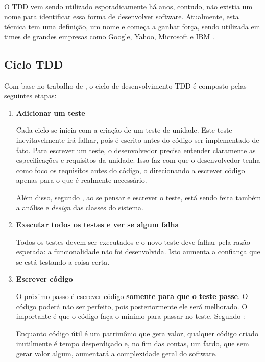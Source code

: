 O TDD vem sendo utilizado esporadicamente há anos, contudo, não existia um nome para identificar essa forma de desenvolver software. Atualmente, esta técnica tem uma definição, um nome e começa a ganhar força, sendo utilizada em times de grandes empresas como Google, Yahoo, Microsoft e IBM \cite{EmpiricalTDD}.

\subsection{Ciclo TDD}
\label{ssub:ciclo_tdd}

Com base no trabalho de , o ciclo de desenvolvimento TDD é composto pelas seguintes etapas:

\begin{enumerate}
\item \textbf{Adicionar um teste}

Cada ciclo se inicia com a criação de um teste de unidade. Este teste inevitavelmente irá falhar, pois é escrito antes do código ser implementado de fato. Para escrever um teste, o desenvolvedor precisa entender claramente as especificações e requisitos da unidade. Isso faz com que o desenvolvedor tenha como foco os requisitos antes do código, o direcionando a escrever código apenas para o que é realmente necessário.

Além disso, segundo , ao se pensar e escrever o teste, está sendo feita também a análise e \textit{design} das classes do sistema.

\item \textbf{Executar todos os testes e ver se algum falha}

Todos os testes devem ser executados e o novo teste deve falhar pela razão esperada: a funcionalidade não foi desenvolvida. Isto aumenta a confiança que se está testando a coisa certa.

\item \textbf{Escrever código}

O próximo passo é escrever código \textbf{somente para que o teste passe}. O código poderá não ser perfeito, pois posteriormente ele será melhorado. O importante é que o código faça o mínimo para passar no teste. Segundo :

\begin{citacao}
Enquanto código útil é um patrimônio que gera valor, qualquer código criado inutilmente é tempo desperdiçado e, no fim das contas, um fardo, que sem gerar valor algum, aumentará a complexidade geral do software.
\end{citacao}


\end{enumerate}
